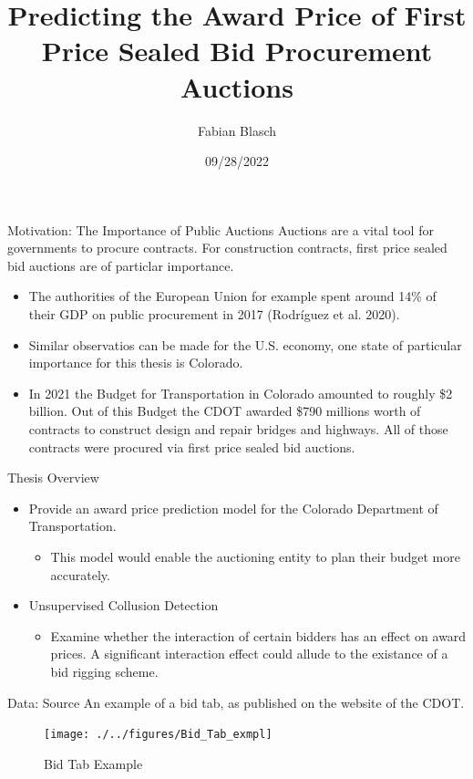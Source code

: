 \documentclass[
  11pt,
  ignorenonframetext,
]{beamer}
\title{Predicting the Award Price of First Price Sealed Bid Procurement
Auctions}
\author{Fabian Blasch}
\date{09/28/2022}
\providecommand{\tightlist}{%
  \setlength{\itemsep}{0pt}\setlength{\parskip}{0pt}}
\begin{document}
\frame{\titlepage}

\begin{frame}{Motivation: The Importance of Public Auctions}
\protect\hypertarget{motivation-the-importance-of-public-auctions}{}
Auctions are a vital tool for governments to procure contracts. For
construction contracts, first price sealed bid auctions are of particlar
importance.

\begin{itemize}
\item
  The authorities of the European Union for example spent around 14\% of
  their GDP on public procurement in 2017 (Rodríguez et al. 2020).
\item
  Similar observatios can be made for the U.S. economy, one state of
  particular importance for this thesis is Colorado.
\item
  In 2021 the Budget for Transportation in Colorado amounted to roughly
  \$2 billion. Out of this Budget the CDOT awarded \$790 millions worth
  of contracts to construct design and repair bridges and highways. All
  of those contracts were procured via first price sealed bid auctions.
\end{itemize}
\end{frame}

\begin{frame}{Thesis Overview}
\protect\hypertarget{thesis-overview}{}
\begin{itemize}
\item
  Provide an award price prediction model for the Colorado Department of
  Transportation.

  \begin{itemize}
  \tightlist
  \item
    This model would enable the auctioning entity to plan their budget
    more accurately.
  \end{itemize}
\item
  Unsupervised Collusion Detection

  \begin{itemize}
  \tightlist
  \item
    Examine whether the interaction of certain bidders has an effect on
    award prices. A significant interaction effect could allude to the
    existance of a bid rigging scheme.
  \end{itemize}
\end{itemize}
\end{frame}

\begin{frame}{Data: Source}
\protect\hypertarget{data-source}{}
An example of a bid tab, as published on the website of the CDOT.

\begin{figure}

{\centering \texttt{[image: ./../figures/Bid\_Tab\_exmpl]} 

}

\caption{Bid Tab Example}\label{fig:unnamed-chunk-2}
\end{figure}
\end{frame}
\end{document}
